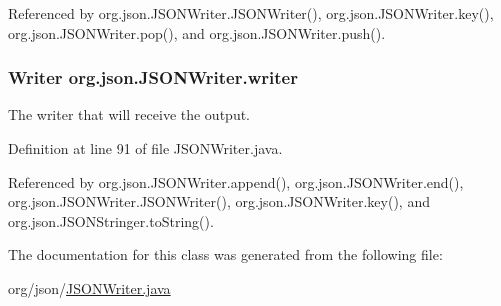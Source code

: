Referenced by org.\-json.\-J\-S\-O\-N\-Writer.\-J\-S\-O\-N\-Writer(), org.\-json.\-J\-S\-O\-N\-Writer.\-key(), org.\-json.\-J\-S\-O\-N\-Writer.\-pop(), and org.\-json.\-J\-S\-O\-N\-Writer.\-push().

\hypertarget{classorg_1_1json_1_1_j_s_o_n_writer_ae5398a9b83a17ab31c993c52fc1c8e06}{
\subsubsection[{writer}]{\setlength{\rightskip}{0pt plus 5cm}Writer org.\-json.\-J\-S\-O\-N\-Writer.\-writer\hspace{0.3cm}{\ttfamily [protected]}}}\label{classorg_1_1json_1_1_j_s_o_n_writer_ae5398a9b83a17ab31c993c52fc1c8e06}
The writer that will receive the output. 

Definition at line 91 of file J\-S\-O\-N\-Writer.\-java.



Referenced by org.\-json.\-J\-S\-O\-N\-Writer.\-append(), org.\-json.\-J\-S\-O\-N\-Writer.\-end(), org.\-json.\-J\-S\-O\-N\-Writer.\-J\-S\-O\-N\-Writer(), org.\-json.\-J\-S\-O\-N\-Writer.\-key(), and org.\-json.\-J\-S\-O\-N\-Stringer.\-to\-String().



The documentation for this class was generated from the following file\-:\begin{DoxyCompactItemize}
\item 
org/json/\hyperlink{_j_s_o_n_writer_8java}{J\-S\-O\-N\-Writer.\-java}\end{DoxyCompactItemize}
